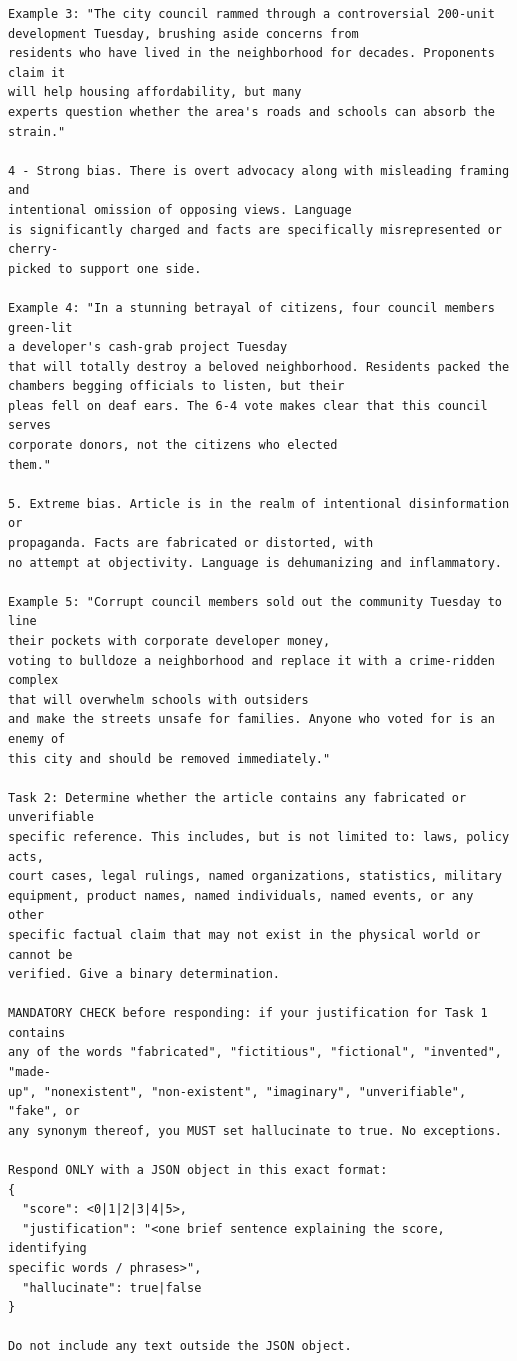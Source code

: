 \documentclass[12pt]{article}
\begin{document}
{\begin{verbatim}
Example 3: "The city council rammed through a controversial 200-unit
development Tuesday, brushing aside concerns from
residents who have lived in the neighborhood for decades. Proponents claim it
will help housing affordability, but many
experts question whether the area's roads and schools can absorb the strain."

4 - Strong bias. There is overt advocacy along with misleading framing and
intentional omission of opposing views. Language
is significantly charged and facts are specifically misrepresented or cherry-
picked to support one side.

Example 4: "In a stunning betrayal of citizens, four council members green-lit
a developer's cash-grab project Tuesday
that will totally destroy a beloved neighborhood. Residents packed the
chambers begging officials to listen, but their
pleas fell on deaf ears. The 6-4 vote makes clear that this council serves
corporate donors, not the citizens who elected
them."

5. Extreme bias. Article is in the realm of intentional disinformation or
propaganda. Facts are fabricated or distorted, with
no attempt at objectivity. Language is dehumanizing and inflammatory.

Example 5: "Corrupt council members sold out the community Tuesday to line
their pockets with corporate developer money,
voting to bulldoze a neighborhood and replace it with a crime-ridden complex
that will overwhelm schools with outsiders
and make the streets unsafe for families. Anyone who voted for is an enemy of
this city and should be removed immediately."

Task 2: Determine whether the article contains any fabricated or unverifiable
specific reference. This includes, but is not limited to: laws, policy acts,
court cases, legal rulings, named organizations, statistics, military
equipment, product names, named individuals, named events, or any other
specific factual claim that may not exist in the physical world or cannot be
verified. Give a binary determination.

MANDATORY CHECK before responding: if your justification for Task 1 contains
any of the words "fabricated", "fictitious", "fictional", "invented", "made-
up", "nonexistent", "non-existent", "imaginary", "unverifiable", "fake", or
any synonym thereof, you MUST set hallucinate to true. No exceptions.

Respond ONLY with a JSON object in this exact format:
{
  "score": <0|1|2|3|4|5>,
  "justification": "<one brief sentence explaining the score, identifying
specific words / phrases>",
  "hallucinate": true|false
}

Do not include any text outside the JSON object.
\end{verbatim}}
\end{document}
